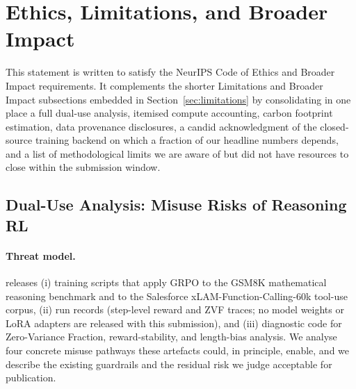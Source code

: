 
\section{Ethics, Limitations, and Broader Impact}
\label{sec:impact_standalone}

This statement is written to satisfy the NeurIPS Code of Ethics and Broader
Impact requirements. It complements the shorter Limitations and Broader
Impact subsections embedded in Section~\ref{sec:limitations} by consolidating
in one place a full dual-use analysis, itemised compute accounting, carbon
footprint estimation, data provenance disclosures, a candid acknowledgment
of the closed-source training backend on which a fraction of our headline
numbers depends, and a list of methodological limits we are aware of but
did not have resources to close within the submission window.

\subsection{Dual-Use Analysis: Misuse Risks of Reasoning RL}
\label{sec:dualuse}

\paragraph{Threat model.}
\ours{} releases (i) training scripts that apply GRPO to the GSM8K
\cite{cobbe2021training} mathematical reasoning benchmark and to the
Salesforce xLAM-Function-Calling-60k \cite{liu2024xlam} tool-use corpus,
(ii) run records (step-level reward and ZVF traces; no model weights or
LoRA adapters are released with this submission), and (iii) diagnostic code for
Zero-Variance Fraction, reward-stability, and length-bias analysis. We
analyse four concrete misuse pathways these artefacts could, in principle,
enable, and we describe the existing guardrails and the residual risk we
judge acceptable for publication.

